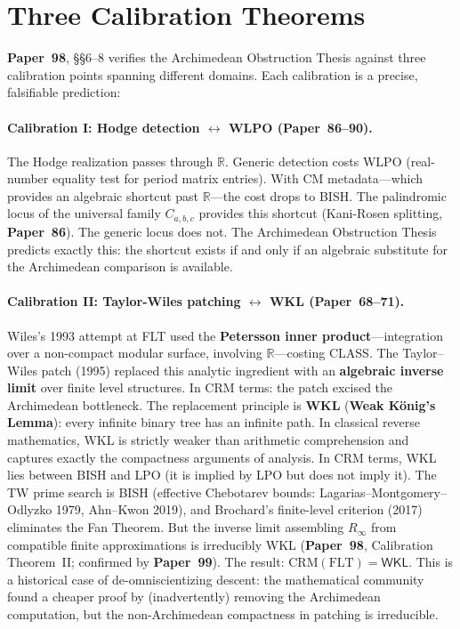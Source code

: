 \documentclass[11pt,twoside,openany]{report}
\theoremstyle{remark}
\newcommand{\BISH}{\textsf{BISH}}
\newcommand{\WKL}{\textsf{WKL}}
\newcommand{\LPO}{\textsf{LPO}}
\newcommand{\CLASS}{\textsf{CLASS}}
\newcommand{\paperref}[1]{\textbf{Paper~#1}}
\begin{document}
\section{Three Calibration Theorems}

\paperref{98}, \S\S6--8 verifies the Archimedean Obstruction Thesis against three calibration points spanning different domains. Each calibration is a precise, falsifiable prediction:

\paragraph{Calibration I: Hodge detection $\longleftrightarrow$ WLPO (\paperref{86--90}).}
The Hodge realization passes through $\mathbb{R}$. Generic detection costs WLPO (real-number equality test for period matrix entries). With CM metadata---which provides an algebraic shortcut past $\mathbb{R}$---the cost drops to \BISH. The palindromic locus of the universal family $C_{a,b,c}$ provides this shortcut (Kani-Rosen splitting, \paperref{86}). The generic locus does not. The Archimedean Obstruction Thesis predicts exactly this: the shortcut exists if and only if an algebraic substitute for the Archimedean comparison is available.

\paragraph{Calibration II: Taylor-Wiles patching $\longleftrightarrow$ WKL (\paperref{68--71}).}
Wiles's 1993 attempt at FLT used the \textbf{Petersson inner product}---integration over a non-compact modular surface, involving $\mathbb{R}$---costing \CLASS. The Taylor--Wiles patch (1995) replaced this analytic ingredient with an \textbf{algebraic inverse limit} over finite level structures. In CRM terms: the patch excised the Archimedean bottleneck. The replacement principle is \textbf{WKL} (\textbf{Weak K\"onig's Lemma}): every infinite binary tree has an infinite path. In classical reverse mathematics, WKL is strictly weaker than arithmetic comprehension and captures exactly the compactness arguments of analysis. In CRM terms, WKL lies between \BISH{} and \LPO{} (it is implied by \LPO{} but does not imply it). The TW prime search is \BISH{} (effective Chebotarev bounds: Lagarias--Montgomery--Odlyzko 1979, Ahn--Kwon 2019), and Brochard's finite-level criterion (2017) eliminates the Fan Theorem. But the inverse limit assembling $R_\infty$ from compatible finite approximations is irreducibly \WKL{} (\paperref{98}, Calibration Theorem~II; confirmed by \paperref{99}). The result: $\mathrm{CRM}(\mathrm{FLT}) = \WKL$. This is a historical case of de-omniscientizing descent: the mathematical community found a cheaper proof by (inadvertently) removing the Archimedean computation, but the non-Archimedean compactness in patching is irreducible.
\end{document}

